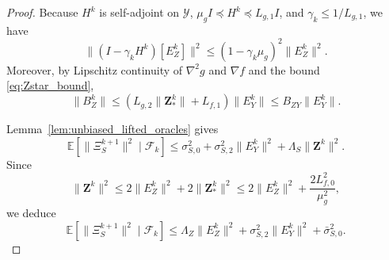 \documentclass{pkumelon}
\theoremstyle{plain}
\newcommand{\E}{\mathbb{E}}
\begin{document}
\begin{proof}
Because $H^k$ is self-adjoint on $\mathcal Y$, $\mu_g I\preceq H^k\preceq L_{g,1}I$, and $\gamma_k\le 1/L_{g,1}$, we have
\begin{equation}\label{eq:Z_contract_product}
\|(I-\gamma_k H^k)[E_Z^k]\|^2
\le
(1-\gamma_k\mu_g)^2\|E_Z^k\|^2.
\end{equation}
Moreover, by Lipschitz continuity of $\nabla^2 g$ and $\nabla f$ and the bound \eqref{eq:Zstar_bound},
\begin{equation}\label{eq:BZ_bound_product}
\|B_Z^k\|
\le
\left(L_{g,2}\|\boldsymbol Z_*^k\|+L_{f,1}\right)\|E_Y^k\|
\le
B_{ZY}\|E_Y^k\|.
\end{equation}

Lemma~\ref{lem:unbiased_lifted_oracles} gives
\begin{equation}\label{eq:S_var_raw_product}
\E[\|\Xi_S^{k+1}\|^2\mid \mathcal F_k]
\le
\sigma_{S,0}^2+\sigma_{S,2}^2\|E_Y^k\|^2+\Lambda_S\|\boldsymbol Z^k\|^2.
\end{equation}
Since
\begin{equation*}
\|\boldsymbol Z^k\|^2 \le 2\|E_Z^k\|^2+2\|\boldsymbol Z_*^k\|^2 \le 2\|E_Z^k\|^2+\frac{2L_{f,0}^2}{\mu_g^2},
\end{equation*}
we deduce
\begin{equation}\label{eq:S_var_final_product}
\E[\|\Xi_S^{k+1}\|^2\mid \mathcal F_k]
\le
\Lambda_Z\|E_Z^k\|^2+\sigma_{S,2}^2\|E_Y^k\|^2+\bar\sigma_{S,0}^2.
\end{equation}


\end{proof}
\end{document}
